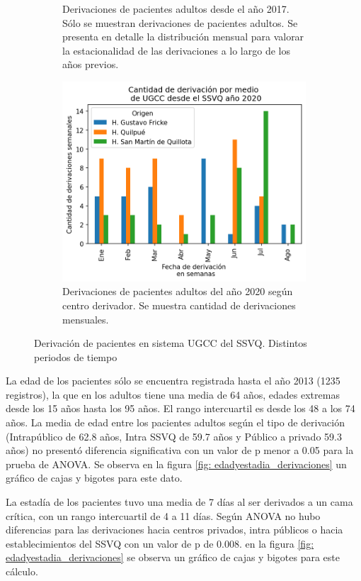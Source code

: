 \documentclass{article}
\begin{document}
\begin{figure}[p]
\begin{subfigure}{.5\textwidth}
		\caption{Derivaciones de pacientes adultos desde el año 2017. Sólo se muestran derivaciones de pacientes adultos. Se presenta en detalle la distribución mensual para valorar la estacionalidad de las derivaciones a lo largo de los años previos.}
	\end{subfigure}
	\centering
	\begin{subfigure}{.5\textwidth}
		\centering
		\includegraphics[width=.8\linewidth]{./figuras/Derivaciones2020.png}
		\caption{Derivaciones de pacientes adultos del año 2020 según centro derivador. Se muestra cantidad de derivaciones mensuales.}
	\end{subfigure}
	\caption{Derivación de pacientes en sistema UGCC del SSVQ. Distintos periodos de tiempo}
	\label{fig: derivacionesUGCC}
\end{figure}


La edad de los pacientes sólo se encuentra registrada hasta el año 2013 (1235 registros), la que en los adultos tiene una media de 64 años, edades extremas desde los 15 años hasta los 95 años. El rango intercuartil es desde los 48 a los 74 años.  La media de edad entre los pacientes adultos según el tipo de derivación (Intrapúblico de 62.8 años, Intra SSVQ de 59.7 años y Público a privado 59.3 años) no presentó diferencia significativa con un valor de p menor a 0.05 para la prueba de ANOVA. Se observa en la figura \ref{fig: edadyestadia_derivaciones} un gráfico de cajas y bigotes para este dato.

La estadía de los pacientes tuvo una media de 7 días al ser derivados a un cama crítica, con un rango intercuartil de 4 a 11 días. Según ANOVA no hubo diferencias para las derivaciones hacia centros privados, intra públicos o hacia establecimientos del SSVQ con un valor de p de 0.008. en la figura \ref{fig: edadyestadia_derivaciones} se observa un gráfico de cajas y bigotes para este cálculo.
\end{document}
